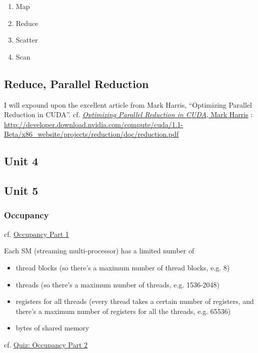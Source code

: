 \documentclass[10pt]{amsart}
\begin{document}
\begin{multicols*}{2}
\begin{enumerate}
\item Map
\item Reduce
\item Scatter
\item Scan
  \end{enumerate}


\subsection{Reduce, Parallel Reduction}

I will expound upon the excellent article from Mark Harris, ``Optimizing Parallel Reduction in CUDA''.  cf. \href{http://developer.download.nvidia.com/compute/cuda/1.1-Beta/x86_website/projects/reduction/doc/reduction.pdf}{\emph{Optimizing Parallel Reduction in CUDA}, Mark Harris} : \url{http://developer.download.nvidia.com/compute/cuda/1.1-Beta/x86_website/projects/reduction/doc/reduction.pdf}


\subsection{Unit 4}

\subsection{Unit 5}

\subsubsection{Occupancy}

cf. \href{https://classroom.udacity.com/courses/cs344/lessons/109244577/concepts/1118375690923#}{Occupancy Part 1}

Each SM (streaming multi-processor) has a limited number of
\begin{itemize}
\item thread blocks (so there's a maximum number of thread blocks, e.g. 8)
\item threads (so there's a maximum number of threads, e.g. 1536-2048)
\item registers for all threads (every thread takes a certain number of registers, and there's a maximum number of registers for all the threads, e.g. 65536)
\item bytes of shared memory
  \end{itemize}

cf. \href{https://classroom.udacity.com/courses/cs344/lessons/109244577/concepts/1110067030923}{Quiz: Occupancy Part 2}


\end{multicols*}
\end{document}
